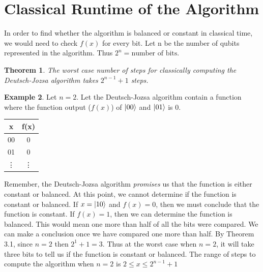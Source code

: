 \documentclass[12pt]{article}
\newtheorem{theorem}{Theorem}[section]
\theoremstyle{definition}
\newtheorem{example}[theorem]{Example}
\begin{document}
\section{Classical Runtime of the Algorithm}
In order to find whether the algorithm is balanced or constant in classical time, we would need to check $f(x)$ for every bit. Let n be the number of qubits represented in the algorithm. Thus $2^n= \text{number of bits}$. 
\begin{theorem}
The worst case number of steps for classically computing the Deutsch-Jozsa algorithm takes $2^{n-1}+1$ steps.
\end{theorem}
\begin{example}
Let $n=2$. Let the Deutsch-Jozsa algorithm contain a function where the function output ($f(x)$) of $\ket{00}$ and $\ket{01}$ is 0. 
 
\begin{center}
\begin{tabular}{|c|c|} 
 \hline
 x & f(x) \\ 
 \hline
 00 & 0 \\ 
 01 & 0 \\ 
 \vdots & \vdots\\
 \hline
\end{tabular}
\end{center}
Remember, the Deutsch-Jozsa algorithm \emph{promises} us that the function is either constant or balanced. At this point, we cannot determine if the function is constant or balanced. If $x = \ket{10}$ and $f(x)=0$, then we must conclude that the function is constant. If $f(x)=1$, then we can determine the function is balanced. This would mean one more than half of all the bits were compared. We can make a conclusion once we have compared one more than half. By Theorem 3.1, since $n=2$ then $2^{1}+1=3$. Thus at the worst case when $n=2$, it will take three bits to tell us if the function is constant or balanced. The range of steps to compute the algorithm when $n=2$ is $2\leq x\leq 2^{n-1}+1$
\end{example}
\end{document}
